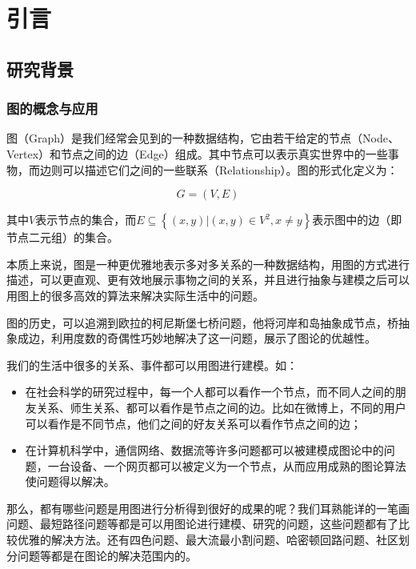 
\chapter{引言}
\label{cha:intro}

\section{研究背景}

\subsection{图的概念与应用}

图（Graph）是我们经常会见到的一种数据结构，它由若干给定的节点（Node、Vertex）和节点之间的边（Edge）组成。其中节点可以表示真实世界中的一些事物，而边则可以描述它们之间的一些联系（Relationship）。图的形式化定义为：

\begin{equation}
G=(V,E)
\end{equation}

\noindent 其中$V$表示节点的集合，而$E \subseteq\left\{(x, y)|(x, y) \in V^{2}, x \neq y\right\}$表示图中的边（即节点二元组）的集合。

本质上来说，图是一种更优雅地表示多对多关系的一种数据结构，用图的方式进行描述，可以更直观、更有效地展示事物之间的关系，并且进行抽象与建模之后可以用图上的很多高效的算法来解决实际生活中的问题。

图的历史，可以追溯到欧拉的柯尼斯堡七桥问题\cite{biggs1986graph}，他将河岸和岛抽象成节点，桥抽象成边，利用度数的奇偶性巧妙地解决了这一问题，展示了图论的优越性。

我们的生活中很多的关系、事件都可以用图进行建模。如：

\begin{itemize}
  \item 在社会科学的研究过程中，每一个人都可以看作一个节点，而不同人之间的朋友关系、师生关系、都可以看作是节点之间的边。比如在微博上，不同的用户可以看作是不同节点，他们之间的好友关系可以看作节点之间的边；
  \item 在计算机科学中，通信网络、数据流等许多问题都可以被建模成图论中的问题，一台设备、一个网页都可以被定义为一个节点，从而应用成熟的图论算法使问题得以解决。
\end{itemize}

\vspace{0.2cm}

那么，都有哪些问题是用图进行分析得到很好的成果的呢？我们耳熟能详的一笔画问题、最短路径问题等都是可以用图论进行建模、研究的问题，这些问题都有了比较优雅的解决方法。还有四色问题、最大流最小割问题、哈密顿回路问题、社区划分问题等都是在图论的解决范围内的。

